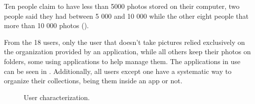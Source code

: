 {Ten people claim to have less than 5000 photos stored on their computer, two people said they had between 5 000 and 10 000 while the other eight people that more than 10 000 photos ().

From the 18 users, only the user that doesn't take pictures relied exclusively on the organization provided by an application, while all others keep their photos on folders, some using applications to help manage them. The applications in use can be seen in . Additionally, all users except one have a systematic way to organize their collections, being them inside an app or not.

\begin{figure}[!htb]
  \begin{subfigmatrix}{3}
  \end{subfigmatrix}
  \caption{User characterization.}
  \label{fig:linear}
\end{figure}




}
